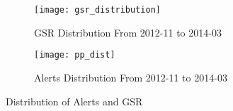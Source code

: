 %
\begin{figure*}
\centering
\begin{subfigure}{.5\textwidth}
  \centering
  \texttt{[image: gsr\_distribution]}
  \caption{GSR Distribution From 2012-11 to 2014-03}
  \label{fig:gsrdistribution}
\end{subfigure}%
\begin{subfigure}{.5\textwidth}
  \centering
  \texttt{[image: pp\_dist]}
  \caption{Alerts Distribution From 2012-11 to 2014-03}
  \label{fig:ppdistribution}
\end{subfigure}
\caption{Distribution of Alerts and GSR}
\label{fig:distribution}
\end{figure*}


